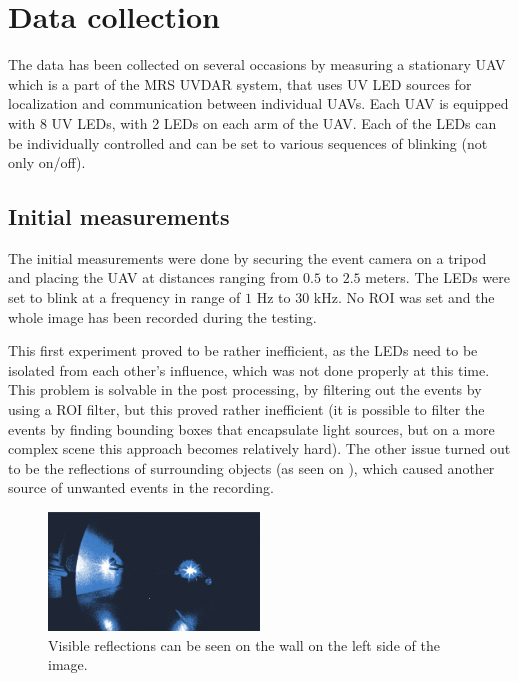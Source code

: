 \section{Data collection}

The data has been collected on several occasions by measuring a stationary UAV which is a part of the MRS UVDAR system, that
uses UV \ac{LED} sources for localization and communication between individual UAVs. 
Each UAV is equipped with 8 UV LEDs, with 2 LEDs on each arm of the UAV. Each of the LEDs can be individually controlled
and can be set to various sequences of blinking (not only on/off).

\subsection{Initial measurements}

The initial measurements were done by securing the event camera on a tripod and placing the UAV at distances ranging from
$0.5$ to $2.5$ meters. The LEDs were set to blink at a frequency in range of $1$ Hz to $30$ kHz. No \ac{ROI} was set
and the whole image has been recorded during the testing.

This first experiment proved to be rather inefficient, as the LEDs need to be isolated from each other's influence, which
was not done properly at this time. This problem is solvable in the post processing, by filtering out the events
by using a ROI filter, but this proved rather inefficient (it is possible to filter the events by finding bounding boxes
that encapsulate light sources, but on a more complex scene this approach becomes relatively hard).
The other issue turned out to be the reflections of surrounding objects (as seen on ), which caused
another source of unwanted events in the recording.

\begin{figure}[H]
  \centering
  \includegraphics[width=0.5\textwidth]{./fig/photos/meas1.png}
  \caption{Visible reflections can be seen on the wall on the left side of the image.}
  \label{fig:meas1}
\end{figure}

